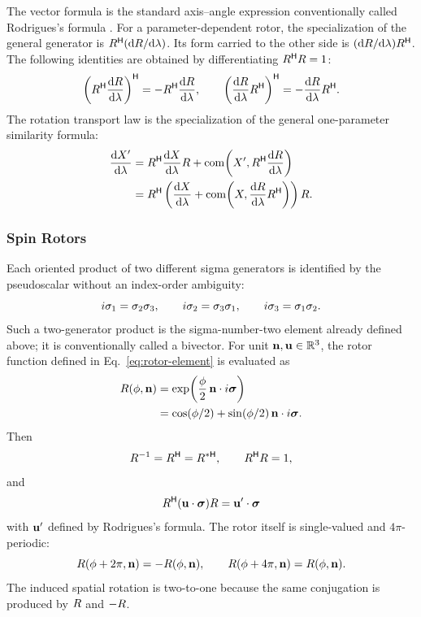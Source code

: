 The vector formula is the standard axis--angle expression conventionally
called Rodrigues's formula \cite{doran2003}.
For a parameter-dependent rotor, the specialization of the general generator
is \(R^{\mathsf H}(\mathrm dR/\mathrm d\lambda)\). Its form carried to the
other side is
\((\mathrm dR/\mathrm d\lambda)R^{\mathsf H}\).
The following identities are obtained by differentiating
\(R^{\mathsf H}R=1\):
\[
\left(R^{\mathsf H}\frac{\mathrm dR}{\mathrm d\lambda}\right)^{\mathsf H}
=-R^{\mathsf H}\frac{\mathrm dR}{\mathrm d\lambda},
\qquad
\left(\frac{\mathrm dR}{\mathrm d\lambda}R^{\mathsf H}\right)^{\mathsf H}
=-\frac{\mathrm dR}{\mathrm d\lambda}R^{\mathsf H}.
\]
The rotation transport law is the specialization of the general
one-parameter similarity formula:
\begin{align*}
\frac{\mathrm dX'}{\mathrm d\lambda}
&=R^{\mathsf H}\frac{\mathrm dX}{\mathrm d\lambda}R
+\operatorname{com}\!\left(X',R^{\mathsf H}\dfrac{\mathrm dR}{\mathrm d\lambda}\right)\\
&=R^{\mathsf H}
\left(\frac{\mathrm dX}{\mathrm d\lambda}
+\operatorname{com}\!\left(X,\dfrac{\mathrm dR}{\mathrm d\lambda}R^{\mathsf H}\right)\right)R.
\end{align*}



\subsubsection{Spin Rotors}
Each oriented product of two different sigma generators is identified by
the pseudoscalar without an index-order ambiguity:
\[
i\sigma_1=\sigma_2\sigma_3,\qquad
i\sigma_2=\sigma_3\sigma_1,\qquad
i\sigma_3=\sigma_1\sigma_2.
\]
Such a two-generator product is the sigma-number-two element already
defined above; it is conventionally called a bivector.
For unit \(\mathbf{n},\mathbf{u}\in\mathbb{R}^3\), the rotor function defined in
Eq.\ \eqref{eq:rotor-element} is evaluated as
\begin{align*}
R(\phi,\mathbf{n})
&=\exp\!\left(\frac{\phi}{2}\,\mathbf{n}\cdot i\mathbf{\bm{\sigma}}\right)\\
&=\cos(\phi/2)
 +\sin(\phi/2)\,\mathbf{n}\cdot i\mathbf{\bm{\sigma}} .
\end{align*}
Then
\[
R^{-1}=R^{\mathsf H}=R^{*\mathsf H},\qquad
R^{\mathsf H}R=1,
\]
and
\[
R^{\mathsf H}(\mathbf{u}\cdot\mathbf{\bm{\sigma}})R
=\mathbf{u}'\cdot\mathbf{\bm{\sigma}}
\]
with \(\mathbf{u}'\) defined by Rodrigues's formula. The rotor itself is
single-valued and \(4\pi\)-periodic:
\[
R(\phi+2\pi,\mathbf{n})=-R(\phi,\mathbf{n}),\qquad
R(\phi+4\pi,\mathbf{n})=R(\phi,\mathbf{n}).
\]
The induced spatial rotation is two-to-one because the same conjugation is
produced by \(R\) and \(-R\).

